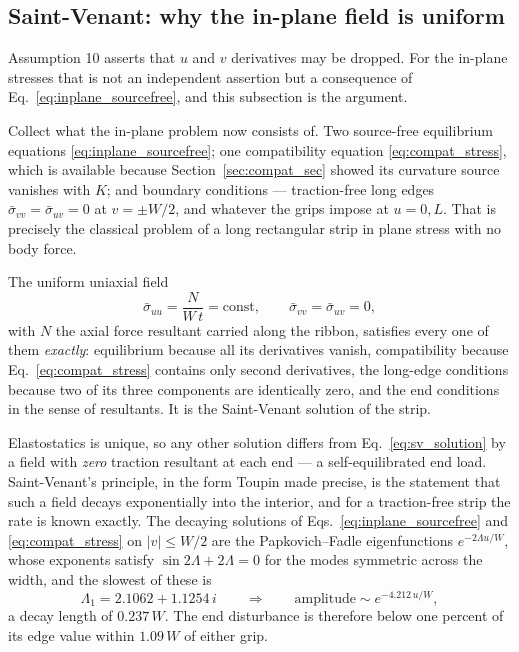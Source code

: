 \documentclass[11pt]{article}
\begin{document}
\subsection{Saint-Venant: why the in-plane field is uniform}
\label{sec:saintvenant}
Assumption 10 asserts that $u$ and $v$ derivatives may be dropped. For the
in-plane stresses that is not an independent assertion but a consequence of
Eq.~\eqref{eq:inplane_sourcefree}, and this subsection is the argument.

Collect what the in-plane problem now consists of. Two source-free equilibrium
equations \eqref{eq:inplane_sourcefree}; one compatibility equation
\eqref{eq:compat_stress}, which is available because
Section~\ref{sec:compat_sec} showed its curvature source vanishes with $K$; and
boundary conditions --- traction-free long edges
$\bar\sigma_{vv} = \bar\sigma_{uv} = 0$ at $v = \pm W/2$, and whatever the grips
impose at $u = 0, L$. That is precisely the classical problem of a long
rectangular strip in plane stress with no body force.

The uniform uniaxial field
\begin{equation}\label{eq:sv_solution}
    \boxed{\;\bar\sigma_{uu} = \frac{N}{W\,t} = \text{const},
    \qquad \bar\sigma_{vv} = \bar\sigma_{uv} = 0,\;}
\end{equation}
with $N$ the axial force resultant carried along the ribbon, satisfies every one
of them \emph{exactly}: equilibrium because all its derivatives vanish,
compatibility because Eq.~\eqref{eq:compat_stress} contains only second
derivatives, the long-edge conditions because two of its three components are
identically zero, and the end conditions in the sense of resultants. It is the
Saint-Venant solution of the strip.

Elastostatics is unique, so any other solution differs from
Eq.~\eqref{eq:sv_solution} by a field with \emph{zero} traction resultant at each
end --- a self-equilibrated end load. Saint-Venant's principle, in the form
Toupin made precise, is the statement that such a field decays exponentially into
the interior, and for a traction-free strip the rate is known exactly. The
decaying solutions of Eqs.~\eqref{eq:inplane_sourcefree} and
\eqref{eq:compat_stress} on $\left|v\right| \le W/2$ are the Papkovich--Fadle
eigenfunctions $e^{-2\Lambda u/W}$, whose exponents satisfy
$\sin 2\Lambda + 2\Lambda = 0$ for the modes symmetric across the width, and the
slowest of these is
\begin{equation}\label{eq:papkovich}
    \boxed{\;\Lambda_{1} = 2.1062 + 1.1254\,i
    \qquad\Longrightarrow\qquad
    \text{amplitude} \sim e^{-4.212\,u/W},\;}
\end{equation}
a decay length of $0.237\,W$. The end disturbance is therefore below one percent
of its edge value within $1.09\,W$ of either grip.
\end{document}
